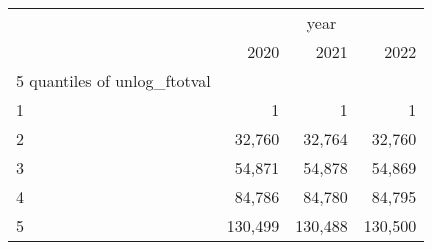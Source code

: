 \begin{tabular}{llll}
\cline{1-4}
\multicolumn{1}{c}{} &
  \multicolumn{3}{|c}{year} \\
\multicolumn{1}{c}{} &
  \multicolumn{1}{|r}{2020} &
  \multicolumn{1}{r}{2021} &
  \multicolumn{1}{r}{2022} \\
\cline{1-4}
\multicolumn{1}{l}{5 quantiles of unlog\_ftotval} &
  \multicolumn{1}{|r}{} &
  \multicolumn{1}{r}{} &
  \multicolumn{1}{r}{} \\
\multicolumn{1}{l}{\hspace{1em}1} &
  \multicolumn{1}{|r}{1} &
  \multicolumn{1}{r}{1} &
  \multicolumn{1}{r}{1} \\
\multicolumn{1}{l}{\hspace{1em}2} &
  \multicolumn{1}{|r}{32,760} &
  \multicolumn{1}{r}{32,764} &
  \multicolumn{1}{r}{32,760} \\
\multicolumn{1}{l}{\hspace{1em}3} &
  \multicolumn{1}{|r}{54,871} &
  \multicolumn{1}{r}{54,878} &
  \multicolumn{1}{r}{54,869} \\
\multicolumn{1}{l}{\hspace{1em}4} &
  \multicolumn{1}{|r}{84,786} &
  \multicolumn{1}{r}{84,780} &
  \multicolumn{1}{r}{84,795} \\
\multicolumn{1}{l}{\hspace{1em}5} &
  \multicolumn{1}{|r}{130,499} &
  \multicolumn{1}{r}{130,488} &
  \multicolumn{1}{r}{130,500} \\
\cline{1-4}
\end{tabular}
